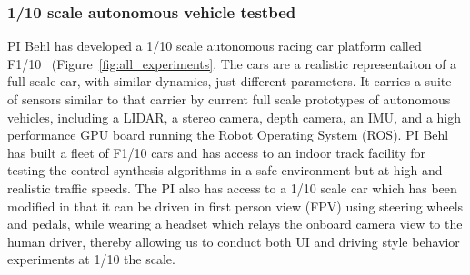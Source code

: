 \subsubsection{1/10 scale autonomous vehicle testbed}

PI Behl has developed a 1/10 scale autonomous racing car platform called F1/10~\cite{f1tenth} (Figure~\ref{fig:all_experiments}. The cars are a realistic representaiton of a full scale car, with similar dynamics, just different parameters. It carries a suite of sensors similar to that carrier by current full scale prototypes of autonomous vehicles, including a LIDAR, a stereo camera, depth camera, an IMU, and a high performance GPU board running the Robot Operating System (ROS).
PI Behl has built a fleet of F1/10 cars and has access to an indoor track facility for testing the control synthesis algorithms in a safe environment but at high and realistic traffic speeds. The PI also has access to a 1/10 scale car which has been modified in that it can be driven in first person view (FPV) using steering wheels and pedals, while wearing a headset which relays the onboard camera view to the human driver, thereby allowing us to conduct both UI and driving style behavior experiments at 1/10 the scale.



